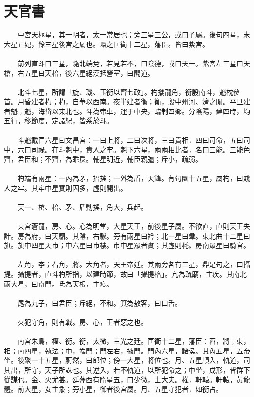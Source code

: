 
\section{天官書}
　　中宮天極星，其一明者，太一常居也；旁三星三公，或曰子屬。後句四星，末大星正妃，餘三星後宮之屬也。環之匡衛十二星，藩臣。皆曰紫宮。
\\\\
　　前列直斗口三星，隨北端兌，若見若不，曰陰德，或曰天一。紫宮左三星曰天槍，右五星曰天棓，後六星絕漢抵營室，曰閣道。
\\\\
　　北斗七星，所謂「旋、璣、玉衡以齊七政」。杓攜龍角，衡殷南斗，魁枕參首。用昏建者杓；杓，自華以西南。夜半建者衡；衡，殷中州河、濟之閒。平旦建者魁；魁，海岱以東北也。斗為帝車，運于中央，臨制四鄉。分陰陽，建四時，均五行，移節度，定諸紀，皆系於斗。
\\\\
　　斗魁戴匡六星曰文昌宮：一曰上將，二曰次將，三曰貴相，四曰司命，五曰司中，六曰司祿。在斗魁中，貴人之牢。魁下六星，兩兩相比者，名曰三能。三能色齊，君臣和；不齊，為乖戾。輔星明近，輔臣親彊；斥小，疏弱。
\\\\
　　杓端有兩星：一內為矛，招搖；一外為盾，天鋒。有句圜十五星，屬杓，曰賤人之牢。其牢中星實則囚多，虛則開出。
\\\\
　　天一、槍、棓、矛、盾動搖，角大，兵起。
\\\\
　　東宮蒼龍，房、心。心為明堂，大星天王，前後星子屬。不欲直，直則天王失計。房為府，曰天駟。其陰，右驂。旁有兩星曰衿；北一星曰舝。東北曲十二星曰旗。旗中四星天市；中六星曰市樓。市中星眾者實；其虛則秏。房南眾星曰騎官。
\\\\
　　左角，李；右角，將。大角者，天王帝廷。其兩旁各有三星，鼎足句之，曰攝提。攝提者，直斗杓所指，以建時節，故曰「攝提格」。亢為疏廟，主疾。其南北兩大星，曰南門。氐為天根，主疫。
\\\\
　　尾為九子，曰君臣；斥絕，不和。箕為敖客，曰口舌。
\\\\
　　火犯守角，則有戰。房、心，王者惡之也。
\\\\
　　南宮朱鳥，權、衡。衡，太微，三光之廷。匡衛十二星，藩臣：西，將；東，相；南四星，執法；中，端門；門左右，掖門。門內六星，諸侯。其內五星，五帝坐。後聚一十五星，蔚然，曰郎位；傍一大星，將位也。月、五星順入，軌道，司其出，所守，天子所誅也。其逆入，若不軌道，以所犯命之；中坐，成形，皆群下從謀也。金、火尤甚。廷藩西有隋星五，曰少微，士大夫。權，軒轅。軒轅，黃龍體。前大星，女主象；旁小星，御者後宮屬。月、五星守犯者，如衡占。
